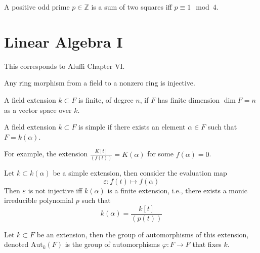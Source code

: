 \documentclass[openany]{book}
\newcommand{\Z}{\mathbb{Z}}
\begin{document}
\begin{thm}[Fermat]
    A positive odd prime $p\in\Z$ is a sum of two squares iff $p\equiv 1\mod 4$.
\end{thm}












\chapter{Linear Algebra I}
This corresponds to Aluffi Chapter VI.



\begin{prop}
    Any ring morphism from a field to a nonzero ring is injective.
\end{prop}


\begin{defn}
    A field extension $k\subset F$ is finite, of degree $n$, if $F$ has finite dimension $\dim F=n$ as a vector space over $k$.
\end{defn}


\begin{defn}
    A field extension $k\subset F$ is simple if there exists an element $\alpha\in F$ such that $F=k(\alpha)$.

    For example, the extension $\frac{K[t]}{(f(t))}=K(\alpha)$ for some $f(\alpha)=0$. 
\end{defn}


\begin{prop}
    Let $k\subset k(\alpha)$ be a simple extension, then consider the evaluation map 
    \begin{equation*}
        \varepsilon: f(t)\mapsto f(\alpha)
    \end{equation*}
    Then $\varepsilon$ is not injective iff $k(\alpha)$ is a finite extension, i.e., there exists a monic irreducible polynomial $p$ such that 
    \begin{equation*}
        k(\alpha)=\frac{k[t]}{(p(t))}
    \end{equation*}
\end{prop}

\begin{defn}
    Let $k\subset F$ be an extension, then the group of automorphisms of this extension, denoted $\text{Aut}_k(F)$ is the group of automorphisms $\varphi:F\to F$ that fixes $k$.
\end{defn}
\end{document}
